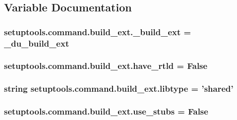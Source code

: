 \subsection{Variable Documentation}
\hypertarget{namespacesetuptools_1_1command_1_1build__ext_a608cc05f8cd4907b6a14eb5971f7876d}{}
\subsubsection[{\+\_\+build\+\_\+ext}]{\setlength{\rightskip}{0pt plus 5cm}setuptools.\+command.\+build\+\_\+ext.\+\_\+build\+\_\+ext = \+\_\+du\+\_\+build\+\_\+ext}\label{namespacesetuptools_1_1command_1_1build__ext_a608cc05f8cd4907b6a14eb5971f7876d}
\hypertarget{namespacesetuptools_1_1command_1_1build__ext_a5ed03ad14d556bf6095784ca350772e7}{}
\subsubsection[{have\+\_\+rtld}]{\setlength{\rightskip}{0pt plus 5cm}setuptools.\+command.\+build\+\_\+ext.\+have\+\_\+rtld = {\bf False}}\label{namespacesetuptools_1_1command_1_1build__ext_a5ed03ad14d556bf6095784ca350772e7}
\hypertarget{namespacesetuptools_1_1command_1_1build__ext_ac22854f97d7214647dc62d6748af00fb}{}
\subsubsection[{libtype}]{\setlength{\rightskip}{0pt plus 5cm}string setuptools.\+command.\+build\+\_\+ext.\+libtype = 'shared'}\label{namespacesetuptools_1_1command_1_1build__ext_ac22854f97d7214647dc62d6748af00fb}
\hypertarget{namespacesetuptools_1_1command_1_1build__ext_a5f734b107b494b1b3c14089cb6087e65}{}
\subsubsection[{use\+\_\+stubs}]{\setlength{\rightskip}{0pt plus 5cm}setuptools.\+command.\+build\+\_\+ext.\+use\+\_\+stubs = {\bf False}}\label{namespacesetuptools_1_1command_1_1build__ext_a5f734b107b494b1b3c14089cb6087e65}
